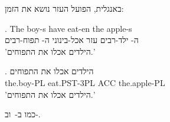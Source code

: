 \documentclass{article}
\begin{document}
באנגלית, הפועל העזר נושא את הזמן:

\begin{english}
\ex. \gll The boy-s have eat-en the apple-s\\
          ה- ילד-רבים עזר אכל-בינוני ה- תפוח-רבים\\
\glt 'הילדים אכלו את התפוחים.'
\end{english}

\ex. \gll הילדים אכלו את התפוחים\\
          the.boy-PL eat.PST-3PL ACC the.apple-PL\\
\glt 'הילדים אכלו את התפוחים.'

כמו ב-\LLast\ וב-\Last.
\end{document}
